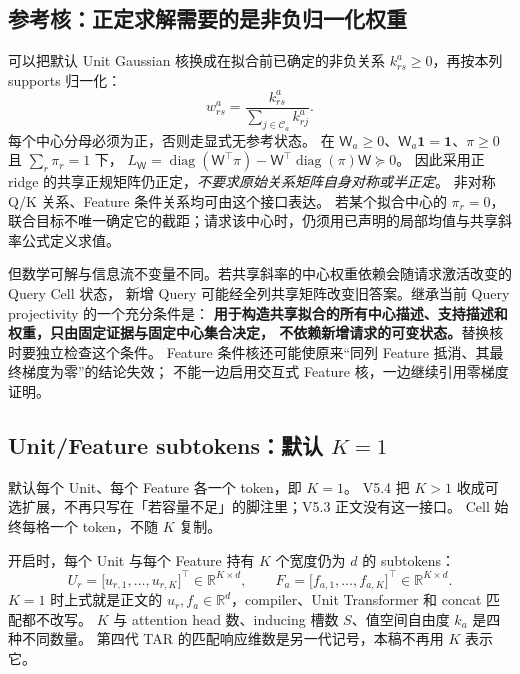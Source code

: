 \documentclass[11pt,UTF8,fontset=fandol]{ctexart}
\numberwithin{equation}{section}
\theoremstyle{definition}
\newcommand{\R}{\mathbb R}
\begin{document}
\subsection{参考核：正定求解需要的是非负归一化权重}
可以把默认 Unit Gaussian 核换成在拟合前已确定的非负关系
$k_{rs}^a\ge0$，再按本列 supports 归一化：
\begin{equation}
 w^a_{rs}=\frac{k^a_{rs}}{\sum_{j\in\mathcal C_a}k^a_{rj}}.
 \label{v52:eq:generic-weight-interface}
\end{equation}
每个中心分母必须为正，否则走显式无参考状态。
在 $\mathsf W_a\ge0$、$\mathsf W_a\bm1=\bm1$、$\pi\ge0$ 且 $\sum_r\pi_r=1$ 下，
$L_{\mathsf W}=\operatorname{diag}(\mathsf W^\top\pi)-\mathsf W^\top\operatorname{diag}(\pi)\mathsf W\succeq0$。
因此采用正 ridge 的共享正规矩阵仍正定，\emph{不要求原始关系矩阵自身对称或半正定}。
非对称 Q/K 关系、Feature 条件关系均可由这个接口表达。
若某个拟合中心的 $\pi_r=0$，联合目标不唯一确定它的截距；请求该中心时，仍须用已声明的局部均值与共享斜率公式定义求值。

但数学可解与信息流不变量不同。若共享斜率的中心权重依赖会随请求激活改变的 Query Cell 状态，
新增 Query 可能经全列共享矩阵改变旧答案。继承当前 Query projectivity 的一个充分条件是：
\textbf{用于构造共享拟合的所有中心描述、支持描述和权重，只由固定证据与固定中心集合决定，
不依赖新增请求的可变状态。}替换核时要独立检查这个条件。
Feature 条件核还可能使原来“同列 Feature 抵消、其最终梯度为零”的结论失效；
不能一边启用交互式 Feature 核，一边继续引用零梯度证明。

\subsection{Unit/Feature subtokens：默认 $K=1$}
\label{v54:sec:subtokens}
默认每个 Unit、每个 Feature 各一个 token，即 $K=1$。
V5.4 把 $K>1$ 收成可选扩展，不再只写在「若容量不足」的脚注里；V5.3 正文没有这一接口。
Cell 始终每格一个 token，不随 $K$ 复制。

开启时，每个 Unit 与每个 Feature 持有 $K$ 个宽度仍为 $d$ 的 subtokens：
\begin{equation}
 U_r=\bigl[u_{r,1},\ldots,u_{r,K}\bigr]^\top\in\R^{K\times d},\qquad
 F_a=\bigl[f_{a,1},\ldots,f_{a,K}\bigr]^\top\in\R^{K\times d}.
 \label{v54:eq:subtoken-banks}
\end{equation}
$K=1$ 时上式就是正文的 $u_r,f_a\in\R^d$，compiler、Unit Transformer 和 concat 匹配都不改写。
$K$ 与 attention head 数、inducing 槽数 $S$、值空间自由度 $k_a$ 是四种不同数量。
第四代 TAR 的匹配响应维数是另一代记号，本稿不再用 $K$ 表示它。
\end{document}
